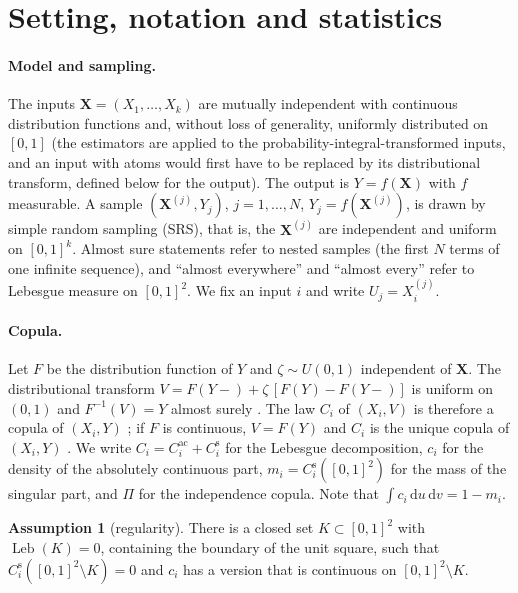 \documentclass[11pt,a4paper]{article}
\theoremstyle{definition}
\newtheorem{assumption}[theorem]{Assumption}
\theoremstyle{remark}
\newcommand{\Leb}{\operatorname{Leb}}
\newcommand{\bX}{\mathbf{X}}
\begin{document}
\section{Setting, notation and statistics}\label{sec:setting}

\paragraph{Model and sampling.} The inputs $\bX=(X_1,\dots,X_k)$ are mutually independent with continuous distribution functions and, without loss of generality, uniformly distributed on $[0,1]$ (the estimators are applied to the probability-integral-transformed inputs, and an input with atoms would first have to be replaced by its distributional transform, defined below for the output). The output is $Y=f(\bX)$ with $f$ measurable. A sample $(\bX^{(j)},Y_j)$, $j=1,\dots,N$, $Y_j=f(\bX^{(j)})$, is drawn by simple random sampling (SRS), that is, the $\bX^{(j)}$ are independent and uniform on $[0,1]^k$. Almost sure statements refer to nested samples (the first $N$ terms of one infinite sequence), and ``almost everywhere'' and ``almost every'' refer to Lebesgue measure on $[0,1]^2$. We fix an input $i$ and write $U_j=X_i^{(j)}$.

\paragraph{Copula.} Let $F$ be the distribution function of $Y$ and $\zeta\sim U(0,1)$ independent of $\bX$. The distributional transform $V=F(Y-)+\zeta\,[F(Y)-F(Y-)]$ is uniform on $(0,1)$ and $F^{-1}(V)=Y$ almost surely \citep[Proposition~2.1]{ruschendorf2009}. The law $C_i$ of $(X_i,V)$ is therefore a copula of $(X_i,Y)$ \citep[Theorem~2.2]{ruschendorf2009}; if $F$ is continuous, $V=F(Y)$ and $C_i$ is the unique copula of $(X_i,Y)$ \citep{sklar1959,nelsen2006}. We write $C_i=C_i^{\mathrm{ac}}+C_i^{\mathrm{s}}$ for the Lebesgue decomposition, $c_i$ for the density of the absolutely continuous part, $m_i=C_i^{\mathrm{s}}([0,1]^2)$ for the mass of the singular part, and $\Pi$ for the independence copula. Note that $\int c_i\,\mathrm{d}u\,\mathrm{d}v=1-m_i$.

\begin{assumption}[regularity]\label{ass:R}
There is a closed set $K\subset[0,1]^2$ with $\Leb(K)=0$, containing the boundary of the unit square, such that $C_i^{\mathrm{s}}([0,1]^2\setminus K)=0$ and $c_i$ has a version that is continuous on $[0,1]^2\setminus K$.
\end{assumption}
\end{document}
